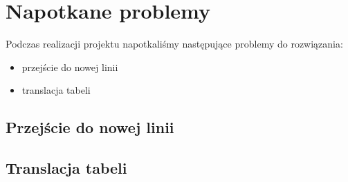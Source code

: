 \chapter{Napotkane problemy}


Podczas realizacji projektu napotkaliśmy następujące problemy do rozwiązania:
    \begin{itemize}
        \item przejście do nowej linii
        \item translacja tabeli
    \end{itemize}

\section{Przejście do nowej linii}

\section{Translacja tabeli}